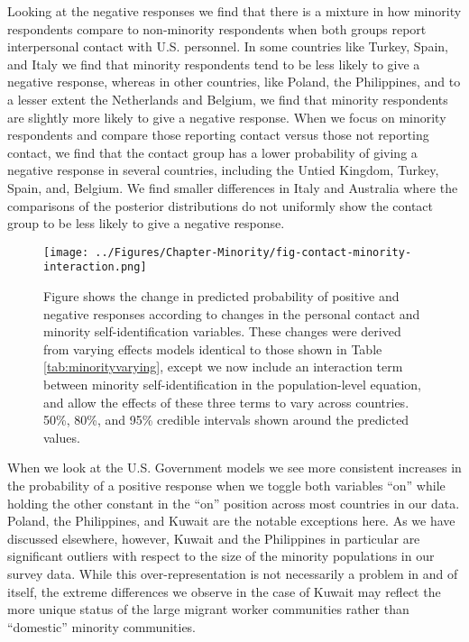 Looking at the negative responses we find that there is a mixture in how minority respondents compare to non-minority respondents when both groups report interpersonal contact with U.S. personnel. In some countries like Turkey, Spain, and Italy we find that minority respondents tend to be less likely to give a negative response, whereas in other countries, like Poland, the Philippines, and to a lesser extent the Netherlands and Belgium, we find that minority respondents are slightly more likely to give a negative response. When we focus on minority respondents and compare those reporting contact versus those not reporting contact, we find that the contact group has a lower probability of giving a negative response in several countries, including the Untied Kingdom, Turkey, Spain, and, Belgium. We find smaller differences in Italy and Australia where the comparisons of the posterior distributions do not uniformly show the contact group to be less likely to give a negative response.

\begin{figure}[t!]
	\centering\texttt{[image: ../Figures/Chapter-Minority/fig-contact-minority-interaction.png]}
	\caption{Figure shows the change in predicted probability of positive and negative responses according to changes in the personal contact and minority self-identification variables. These changes were derived from varying effects models identical to those shown in Table \ref{tab:minorityvarying}, except we now include an interaction term between minority self-identification in the population-level equation, and allow the effects of these three terms to vary across countries. 50\%, 80\%, and 95\% credible intervals shown around the predicted values.}
	\label{fig:minorityinteractionvaryingeffect}
\end{figure}

When we look at the U.S. Government models we see more consistent increases in the probability of a positive response when we toggle both variables ``on'' while holding the other constant in the ``on'' position across most countries in our data. Poland, the Philippines, and Kuwait are the notable exceptions here. As we have discussed elsewhere, however, Kuwait and the Philippines in particular are significant outliers with respect to the size of the minority populations in our survey data. While this over-representation is not necessarily a problem in and of itself, the extreme differences we observe in the case of Kuwait may reflect the more unique status of the large migrant worker communities rather than ``domestic'' minority communities.

